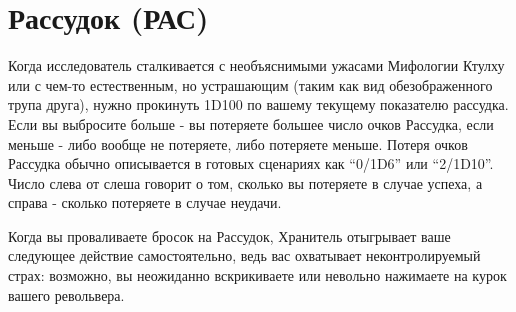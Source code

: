 \documentclass[letterpaper,twocolumn,openany, twoside, 11pt, usenames]{cocbook}
\begin{document}
\section*{Рассудок (РАС)}

Когда исследователь сталкивается с необъяснимыми ужасами Мифологии Ктулху или с чем-то естественным, но устрашающим (таким как вид обезображенного трупа друга), нужно прокинуть 1D100 по вашему текущему показателю рассудка. Если вы выбросите больше - вы потеряете большее число очков Рассудка, если меньше - либо вообще не потеряете, либо потеряете меньше. Потеря очков Рассудка обычно описывается в готовых сценариях как ``0/1D6'' или ``2/1D10''. Число слева от слеша говорит о том, сколько вы потеряете в случае успеха, а справа - сколько потеряете в случае неудачи.

Когда вы проваливаете бросок на Рассудок, Хранитель отыгрывает ваше следующее действие самостоятельно, ведь вас охватывает неконтролируемый страх: возможно, вы неожиданно вскрикиваете или невольно нажимаете на курок вашего револьвера.
\end{document}
